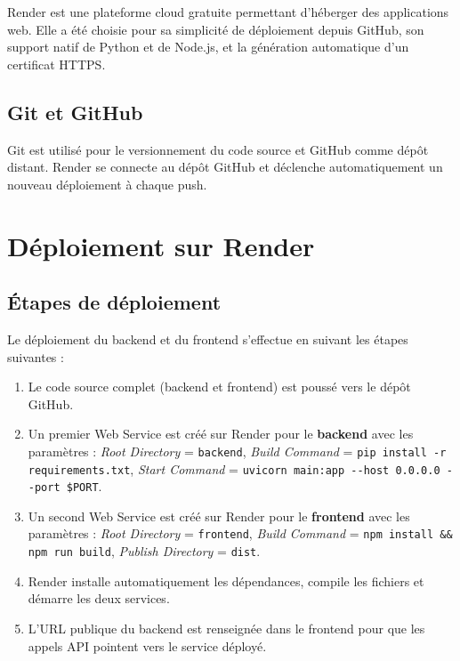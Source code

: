Render est une plateforme cloud gratuite permettant d'héberger des applications web.
Elle a été choisie pour sa simplicité de déploiement depuis GitHub, son support natif
de Python et de Node.js, et la génération automatique d'un certificat HTTPS.

\subsection{Git et GitHub}

Git est utilisé pour le versionnement du code source et GitHub comme dépôt distant.
Render se connecte au dépôt GitHub et déclenche automatiquement un nouveau
déploiement à chaque push.

\section{Déploiement sur Render}

\subsection{Étapes de déploiement}

Le déploiement du backend et du frontend s'effectue en suivant les étapes suivantes :

\begin{enumerate}
    \item Le code source complet (backend et frontend) est poussé vers le dépôt GitHub.

    \item Un premier Web Service est créé sur Render pour le \textbf{backend} avec
    les paramètres : \textit{Root Directory} = \texttt{backend},
    \textit{Build Command} = \texttt{pip install -r requirements.txt},
    \textit{Start Command} = \texttt{uvicorn main:app -{}-host 0.0.0.0 -{}-port \$PORT}.

    \item Un second Web Service est créé sur Render pour le \textbf{frontend} avec
    les paramètres : \textit{Root Directory} = \texttt{frontend},
    \textit{Build Command} = \texttt{npm install \&\& npm run build},
    \textit{Publish Directory} = \texttt{dist}.

    \item Render installe automatiquement les dépendances, compile les fichiers
    et démarre les deux services.

    \item L'URL publique du backend est renseignée dans le frontend pour
    que les appels API pointent vers le service déployé.
\end{enumerate}

